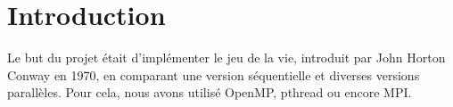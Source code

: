 \section{Introduction} %
\label{sec:introduction}
Le but du projet était d'implémenter le jeu de la vie, introduit par John Horton Conway en 1970, en comparant une version séquentielle et diverses versions parallèles. Pour cela, nous avons utilisé OpenMP, pthread ou encore MPI.

